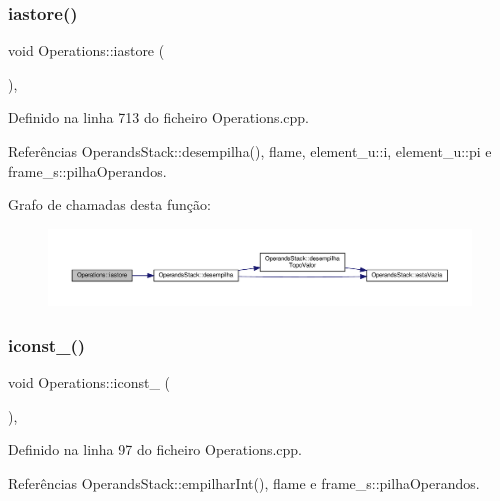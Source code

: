 \subsubsection{\texorpdfstring{iastore()}{iastore()}}
{\footnotesize\ttfamily void Operations\+::iastore (\begin{DoxyParamCaption}{ }\end{DoxyParamCaption})\hspace{0.3cm}{\ttfamily [static]}, {\ttfamily [private]}}



Definido na linha 713 do ficheiro Operations.\+cpp.



Referências Operands\+Stack\+::desempilha(), flame, element\+\_\+u\+::i, element\+\_\+u\+::pi e frame\+\_\+s\+::pilha\+Operandos.

Grafo de chamadas desta função\+:
\nopagebreak
\begin{figure}[H]
\begin{center}
\leavevmode
\includegraphics[width=350pt]{classOperations_aeec162356a6792b1d0ba385f75f443b1_cgraph}
\end{center}
\end{figure}
\mbox{\label{classOperations_a89879486791daebe6659b96688465c9d}} 
\subsubsection{\texorpdfstring{iconst\+\_()}{iconst\_0()}}
{\footnotesize\ttfamily void Operations\+::iconst\+\_ (\begin{DoxyParamCaption}{ }\end{DoxyParamCaption})\hspace{0.3cm}{\ttfamily [static]}, {\ttfamily [private]}}



Definido na linha 97 do ficheiro Operations.\+cpp.



Referências Operands\+Stack\+::empilhar\+Int(), flame e frame\+\_\+s\+::pilha\+Operandos.

